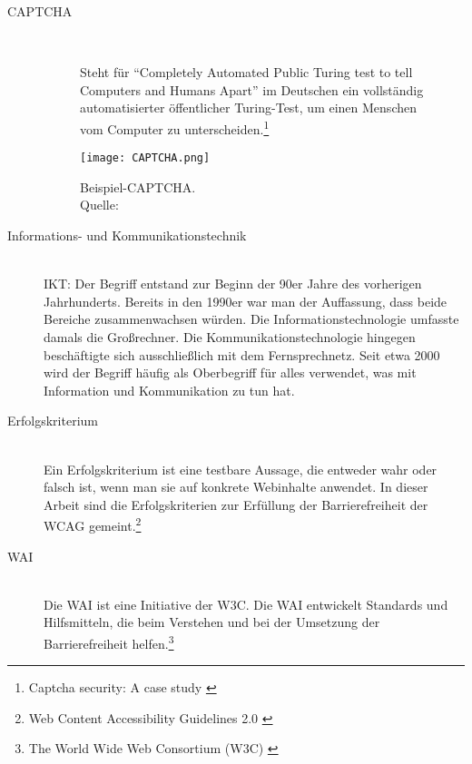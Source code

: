 \begin{description}
	\item[CAPTCHA]\hfill \\
	\begin{figure}[h]
		\begin{minipage}{0.5\textwidth}
			Steht für "`Completely Automated Public Turing test to tell Computers and Humans Apart"' im Deutschen ein vollständig automatisierter öffentlicher
			Turing-Test, um einen Menschen vom Computer zu unterscheiden.\footnote{Captcha security: A case study \cite{yan2009captcha}}
		\end{minipage}
		\hfill
		\begin{minipage}{0.4\textwidth}
			\texttt{[image: CAPTCHA.png]}
			\caption{Beispiel-CAPTCHA. \\Quelle: \cite{yan2009captcha}}
		\end{minipage}
	\end{figure}

	\item[Informations- und Kommunikationstechnik]\hfill \\
	\ac{IKT}: Der Begriff entstand zur Beginn der 90er Jahre des vorherigen Jahrhunderts. Bereits in den 1990er war man der Auffassung, dass beide
	Bereiche zusammenwachsen würden. Die Informationstechnologie umfasste damals die Großrechner. Die Kommunikationstechnologie hingegen beschäftigte
	sich ausschließlich mit dem Fernsprechnetz. Seit etwa 2000 wird der Begriff häufig als Oberbegriff für alles verwendet, was mit Information und Kommunikation
	zu tun hat.
	\\

	\item [Erfolgskriterium]\hfill \\
	Ein Erfolgskriterium ist eine testbare Aussage, die entweder wahr oder falsch ist, wenn man sie auf konkrete Webinhalte anwendet. In dieser
	Arbeit sind die Erfolgskriterien zur Erfüllung der Barrierefreiheit der \ac{WCAG} gemeint.\footnote{Web Content Accessibility Guidelines 2.0 \cite{WCAG2.0}}

	\item[\ac{WAI}]\hfill \\	
	Die \ac{WAI} ist eine Initiative der \ac{W3C}. Die \ac{WAI} entwickelt Standards und Hilfsmitteln, die beim Verstehen und bei der Umsetzung 
	der Barrierefreiheit helfen.\footnote{The World Wide Web Consortium (W3C) \cite{w3c}}


\end{description}
